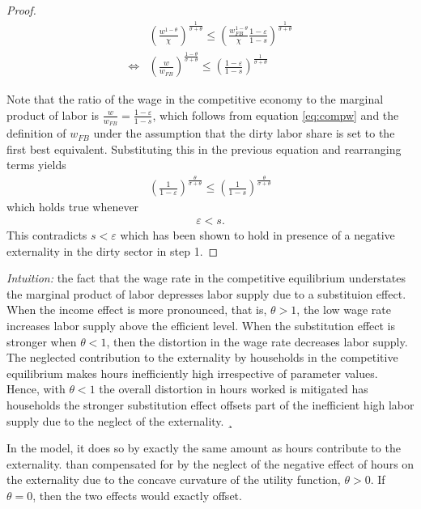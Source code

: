 \begin{proof}
\begin{align}
&\left(\frac{w^{1-\theta}}{\chi}\right)^{\frac{1}{\sigma+\theta}}\leq \left(\frac{w_{FB}^{1-\theta}}{\chi}\frac{1-\varepsilon}{1-s}\right)^\frac{1}{\sigma+\theta}
\\
\Leftrightarrow&\left(\frac{w}{w_{FB}}\right)^{\frac{1-\theta}{\sigma+\theta}}\leq \left(\frac{1-\varepsilon}{1-s}\right)^\frac{1}{\sigma+\theta}
\end{align}

Note that the ratio of the wage in the competitive economy to the marginal product of labor is $\frac{w}{w_{FB}}=\frac{1-\varepsilon}{1-s}$, which follows from equation \ref{eq:compw} and the definition of $w_{FB}$ under the assumption that the dirty labor share is set to the first best equivalent. Substituting this in the previous equation and rearranging terms yields
\begin{align}
\left(\frac{1}{1-\varepsilon}\right)^\frac{\theta}{\sigma+\theta}\leq \left(\frac{1}{1-s}\right)^\frac{\theta}{\sigma+\theta}
\end{align}
which holds true whenever
\begin{align}
\varepsilon<s.
\end{align}
This contradicts $s<\varepsilon$ which has been shown to hold in presence of a negative externality in the dirty sector in step 1. 
\end{proof}

\textit{Intuition:} the fact that the wage rate in the competitive equilibrium understates the marginal product of labor  depresses labor supply due to a substituion effect. When the income effect is more pronounced, that is, $\theta>1$, the low wage rate increases labor supply above the efficient level. When the substitution effect is stronger when $\theta<1$, then the distortion in the wage rate decreases labor supply. 
The neglected contribution to the externality by households in the competitive equilibrium makes hours inefficiently high irrespective of parameter values. 
Hence, with $\theta<1$ the overall distortion in hours worked is mitigated has households the stronger substitution effect offsets part of the inefficient high labor supply due to the neglect of the externality. ¸

In the model, it does so by exactly the same amount as hours contribute to the externality. 
than compensated for by the neglect of the negative effect of hours on the externality due to the concave curvature of the utility function, $\theta>0$. If $\theta=0$, then the two effects would exactly offset. 



